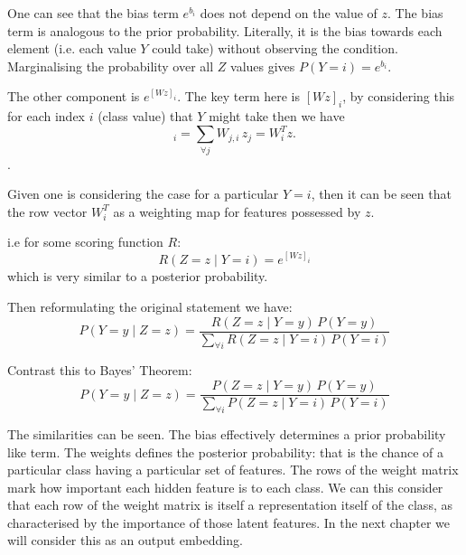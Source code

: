 \documentclass[12pt,parskip]{komatufte}\right
\begin{document}
One can see that the bias term $e^{b_{i}}$ does not depend on the value of $z$.
The bias term is analogous to the prior probability. Literally, it is the bias towards each element (i.e. each value $Y$ could take) without observing the condition.
Marginalising the probability over all $Z$ values gives $P(Y=i)=e^{b_{i}}$. 


The other component is $e^{[Wz]_{i}}$.
The key term here is $[Wz]_{i}$, by considering this for each index $i$ (class value) that $Y$ might take then
we have 
\begin{equation}
[Wz]_{i}=\sum_{\forall j}W_{j,i}\,z_{j}=W_{i}^{T}z.
\end{equation}
.

Given one is considering the case for a particular $Y=i$, then 
it can be seen that the row vector $W_{i}^{T}$ as a weighting map for features possessed by $z$.

i.e for some scoring function $R$:
\begin{equation}
R(Z=z\mid Y=i)=e^{[Wz]_{i}}
\end{equation}
which is very similar to a posterior probability.


Then reformulating the original statement we have:
\begin{equation}
P(Y=y\mid Z=z)=\frac{R(Z=z\mid Y=y)\,P(Y=y)}{\sum_{\forall i}R(Z=z\mid Y=i)\,P(Y=i)}
\end{equation}

Contrast this to Bayes' Theorem:
\begin{equation}
P(Y=y\mid Z=z)=\frac{P(Z=z\mid Y=y)\,P(Y=y)}{\sum_{\forall i}P(Z=z\mid Y=i)\,P(Y=i)}
\end{equation}

The similarities can be seen.
The bias effectively determines a prior probability like term.
The weights defines the posterior probability: that is the chance of a particular class having a particular set of features.
The rows of the weight matrix mark how important each hidden feature is to each class. 
We can this consider that each row of the weight matrix is itself a representation itself of the class, as characterised by the importance of those latent features.
In the next chapter we will consider this as an output embedding.
\end{document}
